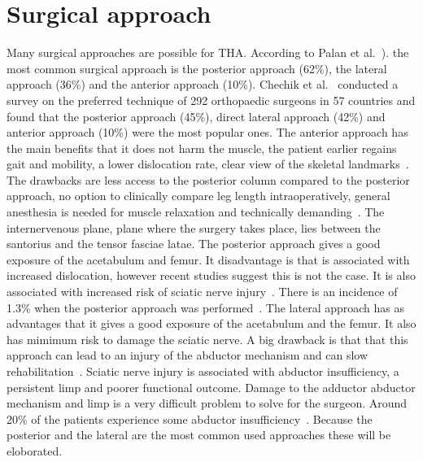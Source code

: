 \documentclass[whitelogo]{tudelft-report}
\begin{document}
{\section{Surgical approach}
Many surgical approaches are possible for THA. According to Palan et al.~\cite{palan2018surgical}). the most common surgical approach is the posterior approach (62\%), the lateral approach (36\%) and the anterior approach (10\%). Chechik et al.~\cite{chechik2013surgical} conducted a survey on the preferred technique of 292 orthopaedic surgeons in 57 countries and found that the posterior approach (45\%), direct lateral approach (42\%) and anterior approach (10\%) were the most popular ones. The anterior approach has the main benefits that it does not harm the muscle, the patient earlier regains gait and mobility, a lower dislocation rate, clear view of the skeletal landmarks~\cite{palan2018surgical}\cite{petis2015surgical}. The drawbacks are less access to the posterior column compared to the posterior approach, no option to clinically compare leg length intraoperatively, general anesthesia is needed for muscle relaxation and technically demanding~\cite{palan2018surgical}. The internervenous plane, plane where the surgery takes place, lies between the santorius and the tensor fasciae latae. The posterior approach gives a good exposure of the acetabulum and femur. It disadvantage is that is associated with increased dislocation, however recent studies suggest this is not the case. It is also associated with increased risk of sciatic nerve injury~\cite{palan2018surgical}. There is an incidence of 1.3\% when the posterior approach was performed~\cite{petis2015surgical}. The lateral approach has as advantages that it gives a good exposure of the acetabulum and the femur. It also has mimimum risk to damage the sciatic nerve. A big drawback is that that this approach can lead to an injury of the abductor mechanism and can slow rehabilitation~\cite{palan2018surgical}. Sciatic nerve injury is associated with abductor insufficiency, a persistent limp and poorer functional outcome. Damage to the adductor abductor mechanism and limp is a very difficult problem to solve for the surgeon. Around 20\% of the patients experience some abductor insufficiency~\cite{masonis2002surgical}. Because the posterior and the lateral are the most common used approaches these will be eloborated.

}
\end{document}
